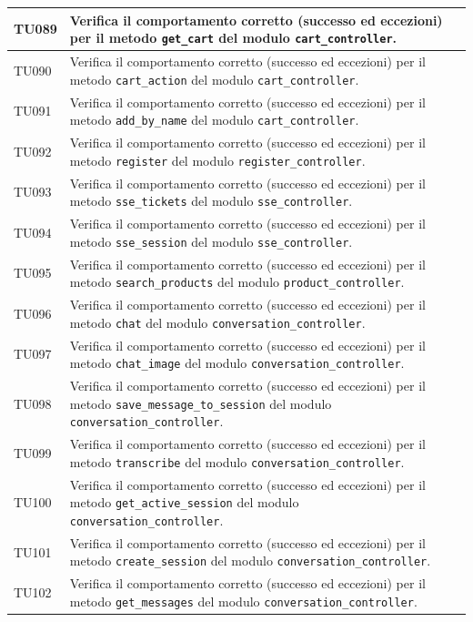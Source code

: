 \documentclass[a4paper,11pt,oneside]{scrartcl}
\begin{document}
\begin{longtable}{|p{1.9cm}|p{11.6cm}|c|}
TU089 & Verifica il comportamento corretto (successo ed eccezioni) per il metodo \texttt{get\_cart} del modulo \texttt{cart\_controller}. & \\ \hline
TU090 & Verifica il comportamento corretto (successo ed eccezioni) per il metodo \texttt{cart\_action} del modulo \texttt{cart\_controller}. & \\ \hline
TU091 & Verifica il comportamento corretto (successo ed eccezioni) per il metodo \texttt{add\_by\_name} del modulo \texttt{cart\_controller}. & \\ \hline
TU092 & Verifica il comportamento corretto (successo ed eccezioni) per il metodo \texttt{register} del modulo \texttt{register\_controller}. & \\ \hline
TU093 & Verifica il comportamento corretto (successo ed eccezioni) per il metodo \texttt{sse\_tickets} del modulo \texttt{sse\_controller}. & \\ \hline
TU094 & Verifica il comportamento corretto (successo ed eccezioni) per il metodo \texttt{sse\_session} del modulo \texttt{sse\_controller}. & \\ \hline
TU095 & Verifica il comportamento corretto (successo ed eccezioni) per il metodo \texttt{search\_products} del modulo \texttt{product\_controller}. & \\ \hline
TU096 & Verifica il comportamento corretto (successo ed eccezioni) per il metodo \texttt{chat} del modulo \texttt{conversation\_controller}. & \\ \hline
TU097 & Verifica il comportamento corretto (successo ed eccezioni) per il metodo \texttt{chat\_image} del modulo \texttt{conversation\_controller}. & \\ \hline
TU098 & Verifica il comportamento corretto (successo ed eccezioni) per il metodo \texttt{save\_message\_to\_session} del modulo \texttt{conversation\_controller}. & \\ \hline
TU099 & Verifica il comportamento corretto (successo ed eccezioni) per il metodo \texttt{transcribe} del modulo \texttt{conversation\_controller}. & \\ \hline
TU100 & Verifica il comportamento corretto (successo ed eccezioni) per il metodo \texttt{get\_active\_session} del modulo \texttt{conversation\_controller}. & \\ \hline
TU101 & Verifica il comportamento corretto (successo ed eccezioni) per il metodo \texttt{create\_session} del modulo \texttt{conversation\_controller}. & \\ \hline
TU102 & Verifica il comportamento corretto (successo ed eccezioni) per il metodo \texttt{get\_messages} del modulo \texttt{conversation\_controller}. & \\ \hline

\end{longtable}
\end{document}
